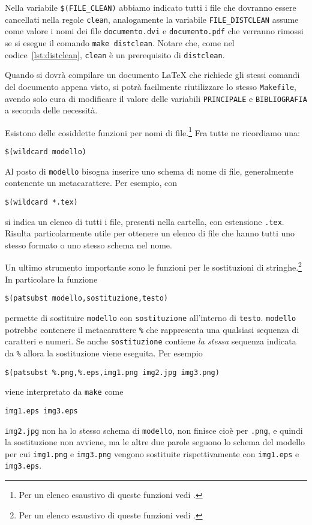 Nella variabile \verb|$(FILE_CLEAN)|
abbiamo indicato tutti i file che dovranno essere cancellati nella regole
\verb|clean|, analogamente la variabile \verb|FILE_DISTCLEAN| assume come valore
i nomi dei file \verb|documento.dvi| e \verb|documento.pdf| che verranno rimossi
se si esegue il comando \verb|make distclean|.  Notare che, come nel
codice~\ref{lst:distclean}, \verb|clean| è un prerequisito di \verb|distclean|.

Quando si dovrà compilare un documento \LaTeX{}
che richiede gli stessi comandi del documento appena visto, si potrà facilmente
riutilizzare lo stesso \verb|Makefile|, avendo solo cura di modificare il valore
delle variabili \verb|PRINCIPALE| e \verb|BIBLIOGRAFIA| a seconda delle
necessità. %

Esistono delle cosiddette funzioni per nomi di
file.\footnote{Per un elenco esaustivo di queste funzioni vedi
  \textcite[83]{gnu:make}.} Fra tutte ne ricordiamo una:
\begin{lstlisting}
$(wildcard modello)
\end{lstlisting}
Al posto di \verb|modello| bisogna inserire uno schema di nome di file,
generalmente contenente un metacarattere. Per esempio, con
\begin{lstlisting}
$(wildcard *.tex)
\end{lstlisting}
si indica un elenco di tutti i file, presenti nella cartella, con estensione
\verb|.tex|.  Risulta particolarmente utile per ottenere un elenco di file che
hanno tutti uno stesso formato o uno stesso schema nel nome.

Un ultimo strumento importante sono le funzioni per le sostituzioni di
stringhe.\footnote{Per un elenco esaustivo di queste funzioni vedi
  \textcite[80]{gnu:make}.}  In particolare la funzione
\begin{lstlisting}
$(patsubst modello,sostituzione,testo)
\end{lstlisting}
permette di sostituire \verb|modello| con \verb|sostituzione| all'interno di
\verb|testo|.  \verb|modello| potrebbe contenere il metacarattere \verb|%| che
rappresenta una qualsiasi sequenza di caratteri e numeri.  Se anche
\verb|sostituzione| contiene \emph{la stessa} sequenza indicata da \verb|%|
allora la sostituzione viene eseguita.  Per esempio
\begin{lstlisting}
$(patsubst %.png,%.eps,img1.png img2.jpg img3.png)
\end{lstlisting}
viene interpretato da \verb|make| come
\begin{verbatim}
img1.eps img3.eps
\end{verbatim}
\verb|img2.jpg| non ha lo stesso schema di \verb|modello|, non finisce cioè per
\verb|.png|, e quindi la sostituzione non avviene, ma le altre due parole
seguono lo schema del modello per cui \verb|img1.png| e \verb|img3.png| vengono
sostituite rispettivamente con \verb|img1.eps| e \verb|img3.eps|.

